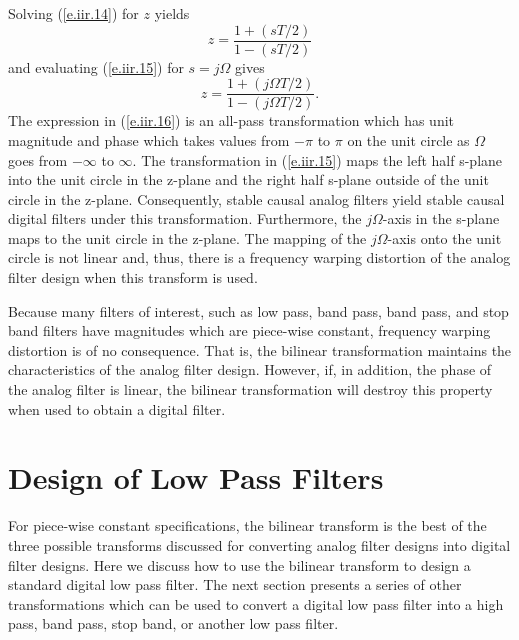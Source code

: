 	Solving (\ref{e.iir.14}) for $z$ yields
%
\begin{equation}
z=\frac{1+(sT/2)}{1-(sT/2)}
\label{e.iir.15}
\end{equation}
%
and evaluating (\ref{e.iir.15}) for $s=j\Omega$ gives
%
\begin{equation}
z=\frac{1+(j\Omega T/2)}{1-(j\Omega T/2)}.
\label{e.iir.16}
\end{equation}
%
The expression in (\ref{e.iir.16}) is an all-pass transformation
which has unit magnitude and phase which takes values from $-\pi$
to $\pi$ on the unit circle as $\Omega$ goes from $-\infty$ to
$\infty$.  The transformation in (\ref{e.iir.15}) maps the left half
s-plane into the unit circle in the z-plane and
the right half s-plane outside of the unit circle
in the z-plane.  Consequently, stable causal analog filters
yield stable causal digital filters under this
transformation.  Furthermore, the $j\Omega$-axis in the
s-plane maps to the unit circle in the z-plane.
The mapping of the $j\Omega$-axis onto the unit circle is not linear
and, thus, there is a frequency warping distortion 
of the analog filter design when this 
transform is used.

	Because many filters of interest, such
as low pass, band pass, band pass, and stop band
filters have magnitudes which are piece-wise constant, frequency
warping distortion is of no consequence.  That is, the bilinear 
transformation maintains the characteristics of the
analog filter design.  However, if, in addition, the
phase of the analog filter is linear, the bilinear
transformation will destroy this property when used to obtain a
digital filter.
\section{Design of Low Pass Filters}

	For piece-wise constant specifications,	
the bilinear transform is the best of the 
three possible transforms discussed for converting
analog filter designs into digital filter designs.
Here we discuss how to use the bilinear transform
to design a standard digital low pass filter.  The next
section presents a series of other transformations
which can be used to convert a digital low pass filter into
a high pass, band pass, stop band, or another low pass filter.

